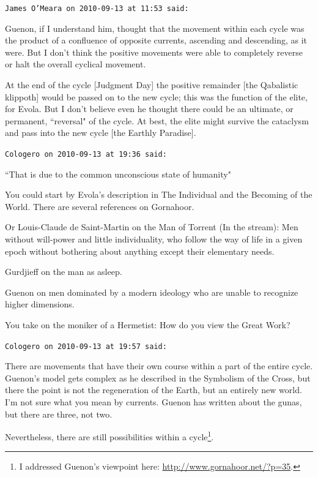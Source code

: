 \begin{footnotesize}\begin{sffamily}



\texttt{James O'Meara on 2010-09-13 at 11:53 said: }

Guenon, if I understand him, thought that the movement within each cycle was the product of a confluence of opposite currents, ascending and descending, as it were. But I don't think the positive movements were able to completely reverse or halt the overall cyclical movement. 

At the end of the cycle [Judgment Day] the positive remainder [the Qabalistic klippoth] would be passed on to the new cycle; this was the function of the elite, for Evola. But I don't believe even he thought there could be an ultimate, or permanent, ``reversal" of the cycle. At best, the elite might survive the cataclysm and pass into the new cycle [the Earthly Paradise].


\hfill

\texttt{Cologero on 2010-09-13 at 19:36 said: }

``That is due to the common unconscious state of humanity"

You could start by Evola's description in The Individual and the Becoming of the World. There are several references on Gornahoor.

Or Louis-Claude de Saint-Martin on the Man of Torrent (In the stream): Men without will-power and little individuality, who follow the way of life in a given epoch without bothering about anything except their elementary needs.

Gurdjieff on the man as asleep.

Guenon on men dominated by a modern ideology who are unable to recognize higher dimensions.

You take on the moniker of a Hermetist: How do you view the Great Work?


\hfill

\texttt{Cologero on 2010-09-13 at 19:57 said: }

There are movements that have their own course within a part of the entire cycle. Guenon's model gets complex as he described in the Symbolism of the Cross, but there the point is not the regeneration of the Earth, but an entirely new world. I'm not sure what you mean by currents. Guenon has written about the gunas, but there are three, not two.

Nevertheless, there are still possibilities within a cycle\footnote{I addressed Guenon's viewpoint here: \url{http://www.gornahoor.net/?p=35}.}.



\end{sffamily}
\end{footnotesize}
